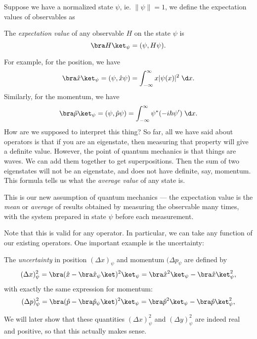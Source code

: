\documentclass[a4paper]{article}
\begin{document}
Suppose we have a normalized state $\psi$, ie. $\|\psi\| = 1$, we define the expectation values of observables as
\begin{defi}
  The \emph{expectation value} of any observable $H$ on the state $\psi$ is
  \[
    \bra H \ket_\psi = (\psi, H\psi).
  \]
\end{defi}
For example, for the position, we have
\[
  \bra \hat{x} \ket_\psi = (\psi, \hat{x}\psi) = \int_{-\infty}^\infty x|\psi(x)|^2 \;\d x.
\]
Similarly, for the momentum, we have
\[
  \bra \hat{p} \ket_{\psi} = (\psi, \hat{p}\psi) = \int_{-\infty}^\infty \psi^* (-i\hbar \psi')\;\d x.
\]
How are we supposed to interpret this thing? So far, all we have said about operators is that if you are an eigenstate, then measuring that property will give a definite value. However, the point of quantum mechanics is that things are waves. We can add them together to get superpositions. Then the sum of two eigenstates will not be an eigenstate, and does not have definite, say, momentum. This formula tells us what the \emph{average value} of any state is.

This is our new assumption of quantum mechanics --- the expectation value is the \emph{mean} or \emph{average} of results obtained by measuring the observable many times, with the system prepared in state $\psi$ before each measurement.

Note that this is valid for any operator. In particular, we can take any function of our existing operators. One important example is the uncertainty:
\begin{defi}[Uncertainty]
  The \emph{uncertainty} in position $(\Delta x)_\psi$ and momentum $(\Delta p_\psi$ are defined by
  \[
    (\Delta x)_\psi^2 = \bra (\hat{x} - \bra \hat{x}_\psi\ket)^2 \ket_\psi = \bra \hat{x}^2\ket_\psi - \bra \hat{x}\ket^2_\psi,
  \]
  with exactly the same expression for momentum:
  \[
    (\Delta p)_\psi^2 = \bra (\hat{p} - \bra \hat{p}_\psi\ket)^2 \ket_\psi = \bra \hat{p}^2\ket_\psi - \bra \hat{p}\ket^2_\psi,
  \]
\end{defi}
We will later show that these quantities $(\Delta x)_\psi^2$ and $(\Delta y)_\psi^2$ are indeed real and positive, so that this actually makes sense.
\end{document}
